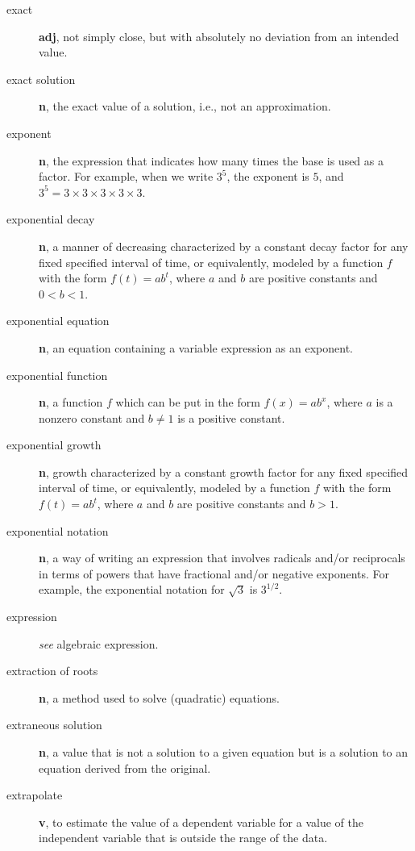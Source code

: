 \documentclass[10pt,]{book}
\newcommand{\terminology}[1]{\textbf{#1}}
\theoremstyle{plain}
\theoremstyle{definition}
\theoremstyle{definition}
\theoremstyle{definition}
\numberwithin{equation}{part}
\newcommand{\lt}{<}
\newcommand{\gt}{>}
\begin{document}
\begin{description}
\item[{exact}]\hypertarget{li-574}{}\terminology{adj}, not simply close, but with absolutely no deviation from an intended value.%
\item[{exact solution}]\hypertarget{li-575}{}\terminology{n}, the exact value of a solution, i.e., not an approximation.%
\item[{exponent}]\hypertarget{li-576}{}\terminology{n}, the expression that indicates how many times the base is used as a factor. For example, when we write \(3^5\), the exponent is \(5\), and \(3^5 = 3\times 3\times 3\times 3\times 3\).%
\item[{exponential decay}]\hypertarget{li-577}{}\terminology{n}, a manner of decreasing characterized by a constant decay factor for any fixed specified interval of time, or equivalently, modeled by a function \(f\) with the form \(f(t) = ab^t\), where \(a\) and \(b\) are positive constants and \(0 \lt b\lt 1\).%
\item[{exponential equation}]\hypertarget{li-578}{}\terminology{n}, an equation containing a variable expression as an exponent.%
\item[{exponential function}]\hypertarget{li-579}{}\terminology{n}, a function \(f\) which can be put in the form \(f(x) = ab^x\), where \(a\) is a nonzero constant and \(b\ne 1\) is a positive constant.%
\item[{exponential growth}]\hypertarget{li-580}{}\terminology{n}, growth characterized by a constant growth factor for any fixed specified interval of time, or equivalently, modeled by a function \(f\) with the form \(f(t) = ab^t\), where \(a\) and \(b\) are positive constants and \(b\gt 1\).%
\item[{exponential notation}]\hypertarget{li-581}{}\terminology{n}, a way of writing an expression that involves radicals and/or reciprocals in terms of powers that have fractional and/or negative exponents. For example, the exponential notation for \(\sqrt{3}\) is \(3^{1/2}\).%
\item[{expression}]\hypertarget{li-582}{}\emph{see} algebraic expression.%
\item[{extraction of roots}]\hypertarget{li-583}{}\terminology{n}, a method used to solve (quadratic) equations.%
\item[{extraneous solution}]\hypertarget{li-584}{}\terminology{n}, a value that is not a solution to a given equation but is a solution to an equation derived from the original.%
\item[{extrapolate}]\hypertarget{li-585}{}\terminology{v}, to estimate the value of a dependent variable for a value of the independent variable that is outside the range of the data.%
\end{description}
%
\typeout{************************************************}
\typeout{************************************************}
\end{document}
